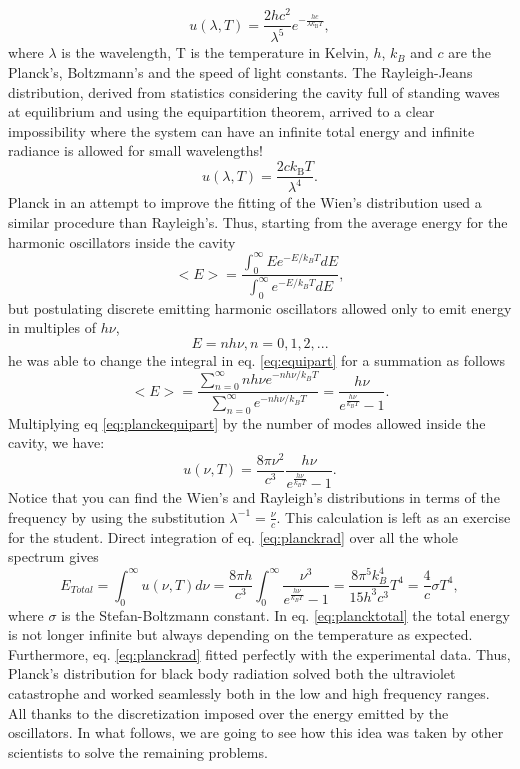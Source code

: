 \documentclass{article}
\begin{document}
\begin{equation}
  u(\lambda, T) = \frac{2hc^2}{\lambda^5} e^{-\frac{hc}{\lambda k_\text{B} T}},
\end{equation}
where $\lambda$ is the wavelength, T is the temperature in Kelvin, $h$, $k_B$ and $c$ are the Planck's, Boltzmann's and the speed of light constants.
The Rayleigh-Jeans distribution, derived from statistics considering the cavity full of standing waves at equilibrium and using the equipartition theorem, arrived to a clear impossibility where the system can have an infinite total energy and infinite radiance is allowed for small wavelengths! 
\begin{equation}
  u(\lambda,T) = \frac{2ck_\text{B}T}{\lambda^4}.
\end{equation}
Planck in an attempt to improve the fitting of the Wien's distribution used a similar procedure than Rayleigh's. Thus, starting from the average energy for the harmonic oscillators inside the cavity
\begin{equation}\label{eq:equipart}
  <E> = \frac{\int_0^\infty E e^{-E/k_B T}dE}{\int_0^\infty e^{-E/k_B T}dE},
\end{equation}
but postulating discrete emitting harmonic oscillators allowed only to emit energy in multiples of $h\nu$,
\begin{equation}
  E = nh\nu, n=0,1,2,...
\end{equation}
he was able to change the integral in eq. \ref{eq:equipart} for a summation as follows
\begin{equation}\label{eq:planckequipart}
  <E> = \frac{\sum_{n=0}^\infty nh\nu e^{-nh\nu/k_B T}}{\sum_{n=0}^\infty e^{-nh\nu/k_B T}} = \frac{h\nu}{e^{\frac{h\nu}{k_B T}}-1}.
\end{equation}
Multiplying eq \ref{eq:planckequipart} by the number of modes allowed inside the cavity, we have:
\begin{equation}\label{eq:planckrad}
  u(\nu,T) = \frac{8\pi\nu^2}{c^3} \frac{h\nu}{e^{\frac{h\nu}{k_B T}}-1}.
\end{equation}
Notice that you can find the Wien's and Rayleigh's distributions in terms of the frequency by using the substitution $\lambda^{-1}=\frac{\nu}{c}$. This calculation is left as an exercise for the student.
Direct integration of eq. \ref{eq:planckrad} over all the whole spectrum gives
\begin{equation}\label{eq:plancktotal}
  E_{Total} = \int_{0}^{\infty}u(\nu,T)d\nu = \frac{8\pi h}{c^3} \int_0 ^{\infty} \frac{\nu^3}{e^{\frac{h\nu}{k_B T}}-1}=\frac{8\pi^5k_B ^4}{15h^3 c^3}T^4=\frac{4}{c}\sigma T^4,
\end{equation}
where $\sigma$ is the Stefan-Boltzmann constant. In eq. \ref{eq:plancktotal} the total energy is not longer infinite but always depending on the temperature as expected. Furthermore, eq. \ref{eq:planckrad} fitted perfectly with the experimental data. Thus, Planck's distribution for black body radiation solved both the ultraviolet catastrophe and worked seamlessly both in the low and high frequency ranges. All thanks to the discretization imposed over the energy emitted by the oscillators. 
In what follows, we are going to see how this idea was taken by other scientists to solve the remaining problems.
\end{document}
